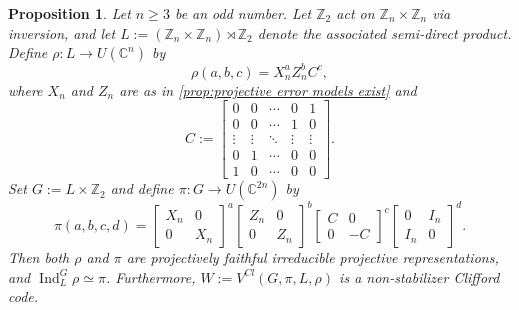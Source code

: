 \documentclass[11pt, oneside, reqno]{amsart}
\newcommand{\bbZ}{\mathbb{Z}}
\newcommand{\bbC}{\mathbb{C}}
\newcommand{\Ind}{\operatorname{Ind}}
\theoremstyle{definition}
\theoremstyle{plain}
\newtheorem{proposition}[definition]{Proposition}
\theoremstyle{remark}
\begin{document}
\begin{proposition}\label{prop:family of non-stabilizer Clifford codes}
    Let $n \geq 3$ be an odd number. Let $\bbZ_2$ act on $\bbZ_n \times \bbZ_n$ via inversion, and let $L := (\bbZ_n \times \bbZ_n) \rtimes \bbZ_2$ denote the associated semi-direct product. Define $\rho \colon L \to U(\bbC^n)$ by
    \begin{equation*}
        \rho(a,b,c) = X_n^a Z_n^b C^c,
    \end{equation*}
    where $X_n$ and $Z_n$ are as in \cref{prop:projective error models exist} and
    \begin{equation*}
        C :=
        \begin{bmatrix}
            0 & 0 & \cdots & 0 & 1 \\
            0 & 0 & \cdots & 1 & 0 \\
            \vdots & \vdots & \ddots & \vdots & \vdots \\
            0 & 1 & \cdots & 0 & 0 \\
            1 & 0 & \cdots & 0 & 0
        \end{bmatrix}.
    \end{equation*}
    Set $G := L \times \bbZ_2$ and define $\pi \colon G \to U(\bbC^{2n})$ by
    \begin{equation*}
        \pi(a,b,c,d) =
        \begin{bmatrix}
            X_n & 0 \\
            0 & X_n 
        \end{bmatrix}^a
        \begin{bmatrix}
            Z_n & 0 \\
            0 & Z_n 
        \end{bmatrix}^b
        \begin{bmatrix}
            C & 0 \\
            0 & -C 
        \end{bmatrix}^c
        \begin{bmatrix}
            0 & I_n \\
            I_n & 0 
        \end{bmatrix}^d.
    \end{equation*}
    Then both $\rho$ and $\pi$ are projectively faithful irreducible projective representations, and $\Ind_L^G\rho \simeq \pi$. Furthermore, $W := V^{Cl}(G,\pi,L,\rho)$ is a non-stabilizer Clifford code.
\end{proposition}
\end{document}
